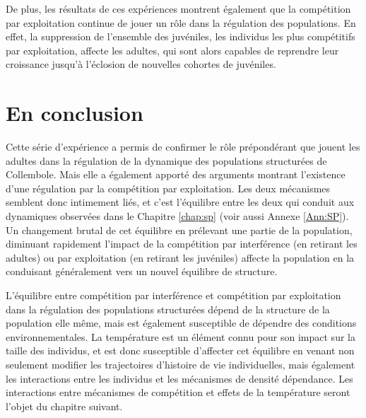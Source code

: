 De plus, les résultats de ces expériences montrent également que la compétition
par exploitation continue de jouer un rôle dans la régulation des populations.
En effet, la suppression de l'ensemble des juvéniles, les individus les plus
compétitifs par exploitation, affecte les adultes, qui sont alors capables de
reprendre leur croissance jusqu'à l'éclosion de nouvelles cohortes de juvéniles.

\section{En conclusion}

Cette série d'expérience a permis de confirmer le rôle
prépondérant que jouent les adultes dans la régulation de la dynamique des
populations structurées de Collembole. Mais elle a également apporté des
arguments montrant l'existence d'une régulation par la compétition par
exploitation. Les deux mécanismes semblent donc intimement liés, et c'est
l'équilibre entre les deux qui conduit aux dynamiques observées dans le Chapitre
\ref{chap:sp} (voir aussi Annexe \ref{Ann:SP}). Un changement brutal de cet
équilibre en prélevant une partie de la population, diminuant rapidement l'impact de la compétition par interférence
(en retirant les adultes) ou par exploitation (en retirant les juvéniles)
affecte la population en la conduisant généralement vers un nouvel équilibre de
structure. 

L'équilibre entre compétition par interférence et compétition par exploitation
dans la régulation des populations structurées dépend de la structure de la
population elle même, mais est également susceptible de dépendre des conditions
environnementales. La température est un élément connu pour son impact sur la
taille des individus, et est donc susceptible d'affecter cet équilibre en venant
non seulement modifier les trajectoires d'histoire de vie individuelles, mais
également les interactions entre les individus et les mécanismes de densité
dépendance. Les interactions entre mécanismes de compétition et effets
de la température seront l'objet du chapitre suivant. 

